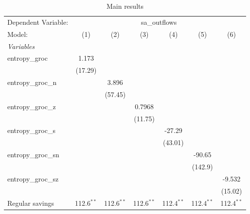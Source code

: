 
\begin{table}[htbp]
   \centering
   \caption{\label{tab:reg_sa_outflows_groc.tex} Main results}
   \begin{footnotesize}
      \begin{tabular}{lcccccc}
         \tabularnewline\midrule\midrule
         Dependent Variable: & \multicolumn{6}{c}{sa\_outflows}\\
         Model:              & (1)           & (2)           & (3)           & (4)           & (5)           & (6)\\
         \midrule \emph{Variables} &   &   &   &   &   &  \\
         entropy\_groc      & 1.173         &               &               &               &               &   \\
                             & (17.29)       &               &               &               &               &   \\
         entropy\_groc\_n  &               & 3.896         &               &               &               &   \\
                             &               & (57.45)       &               &               &               &   \\
         entropy\_groc\_z  &               &               & 0.7968        &               &               &   \\
                             &               &               & (11.75)       &               &               &   \\
         entropy\_groc\_s  &               &               &               & -27.29        &               &   \\
                             &               &               &               & (43.01)       &               &   \\
         entropy\_groc\_sn &               &               &               &               & -90.65        &   \\
                             &               &               &               &               & (142.9)       &   \\
         entropy\_groc\_sz &               &               &               &               &               & -9.532\\
                             &               &               &               &               &               & (15.02)\\
         Regular savings     & 112.6$^{**}$  & 112.6$^{**}$  & 112.6$^{**}$  & 112.4$^{**}$  & 112.4$^{**}$  & 112.4$^{**}$\\

\end{tabular}
\end{footnotesize}
\end{table}
